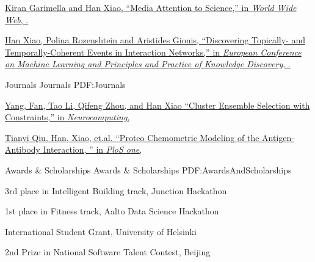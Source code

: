\documentclass[letterpaper,MMMyyyy,nonstopmode]{simpleresumecv}
\begin{document}
\begin{Body}
\begingroup
\BigGap

\href{http://www.example.com/my-paper-doi-3}
{Kiran Garimella and \underline{Han Xiao}, 
``Media Attention to Science,''
in \textit{World Wide Web},
.}

\BigGap

\href{http://www.example.com/my-paper-doi-3}
{\underline{Han Xiao}, Polina Rozenshtein and Aristides Gionis, 
``Discovering Topically- and Temporally-Coherent Events in Interaction Networks,''
in \textit{European Conference on Machine Learning and Principles and Practice of Knowledge Discovery},
.}

\endgroup

\BigGap

\SubSection
{Journals}
{Journals}
{PDF:Journals}

\begingroup

\BigGap

\href{http://www.example.com/my-paper-doi-3}
{Yang, Fan, Tao Li, Qifeng Zhou, and \underline{Han Xiao}
  ``Cluster Ensemble Selection with Constraints,''
  in \textit{Neurocomputing},
}

\BigGap

\href{http://www.example.com/my-paper-doi-3}
{Tianyi Qiu, \underline{Han, Xiao}, et.al.
  ``Proteo Chemometric Modeling of the Antigen-Antibody Interaction, ''
  in \textit{PloS one},
  }


\endgroup



\Section
{Awards \&\newline
Scholarships}
{Awards \& Scholarships}
{PDF:AwardsAndScholarships}

\BulletItem
3rd place in Intelligent Building track,
Junction Hackathon
\hfill
{}

\Gap

\BulletItem
1st place in Fitness track,
Aalto Data Science Hackathon
\hfill
{}

\Gap

\BulletItem
International Student Grant,
University of Helsinki
\hfill
{}

\Gap
\BulletItem
2nd Prize in National Software Talent Contest, 
Beijing
\hfill
{}


\end{Body}
\end{document}

